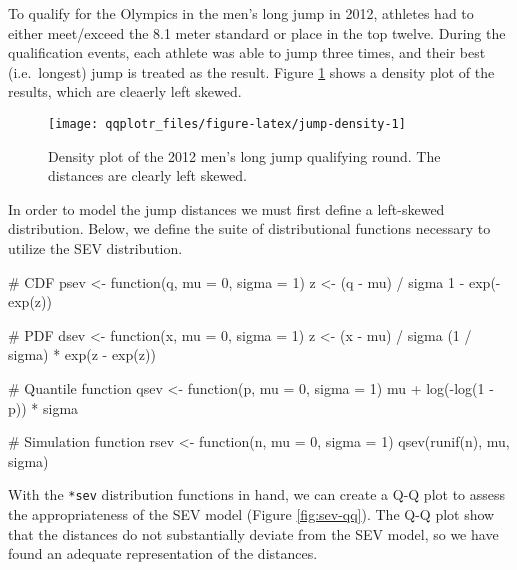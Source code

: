 To qualify for the Olympics in the men's long jump in 2012, athletes had
to either meet/exceed the 8.1 meter standard or place in the top twelve.
During the qualification events, each athlete was able to jump three
times, and their best (i.e.~longest) jump is treated as the result.
Figure \ref{fig:jump-density} shows a density plot of the results, which
are cleaerly left skewed.

\begin{Schunk}
\begin{figure}

{\centering \texttt{[image: qqplotr\_files/figure-latex/jump-density-1]} 

}

\caption[Density plot of the 2012 men's long jump qualifying round]{Density plot of the 2012 men's long jump qualifying round. The distances are clearly left skewed.}\label{fig:jump-density}
\end{figure}
\end{Schunk}

In order to model the jump distances we must first define a left-skewed
distribution. Below, we define the suite of distributional functions
necessary to utilize the SEV distribution.

\begin{Schunk}
\begin{Sinput}
# CDF
psev <- function(q, mu = 0, sigma = 1) {
    z <- (q - mu) / sigma
    1 - exp(-exp(z))
}

# PDF
dsev <- function(x, mu = 0, sigma = 1) {
  z <- (x - mu) / sigma
  (1 / sigma) * exp(z - exp(z))
}

# Quantile function
qsev <- function(p, mu = 0, sigma = 1) {
  mu + log(-log(1 - p)) * sigma
}

# Simulation function
rsev <- function(n, mu = 0, sigma = 1) {
  qsev(runif(n), mu, sigma)
}
\end{Sinput}
\end{Schunk}

With the \texttt{*sev} distribution functions in hand, we can create a
Q-Q plot to assess the appropriateness of the SEV model (Figure
\ref{fig:sev-qq}). The Q-Q plot show that the distances do not
substantially deviate from the SEV model, so we have found an adequate
representation of the distances.

